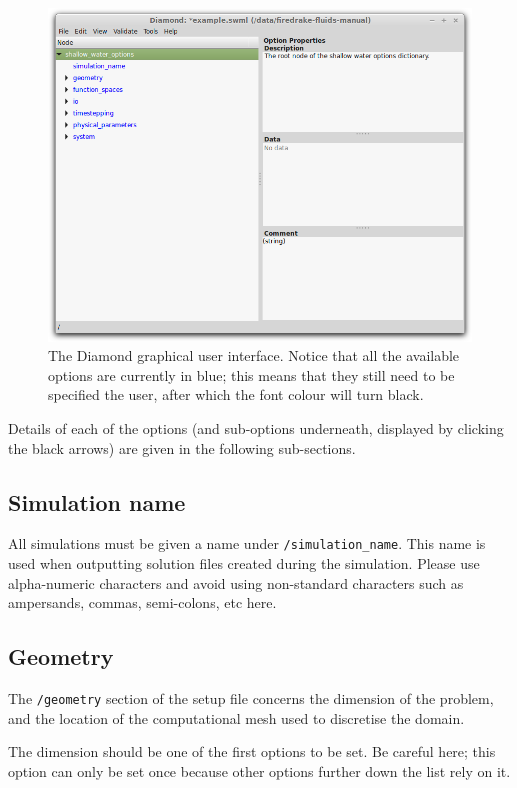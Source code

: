 \documentclass[a4paper,11pt]{report}
\begin{document}
\begin{figure}[!ht]
   \centering
   \includegraphics[width=1\columnwidth]{images/diamond.png}
   \caption{The Diamond \citep{Ham_etal_2009} graphical user interface. Notice that all the available options are currently in blue; this means that they still need to be specified the user, after which the font colour will turn black.}
   \label{fig:diamond}
\end{figure}

Details of each of the options (and sub-options underneath, displayed by clicking the black arrows) are given in the following sub-sections.

\subsection{Simulation name}
All simulations must be given a name under \texttt{/simulation\_name}. This name is used when outputting solution files created during the simulation. Please use alpha-numeric characters and avoid using non-standard characters such as ampersands, commas, semi-colons, etc here.

\subsection{Geometry}
The \texttt{/geometry} section of the setup file concerns the dimension of the problem, and the location of the computational mesh used to discretise the domain.

The dimension should be one of the first options to be set. Be careful here; this option can only be set once because other options further down the list rely on it.
\end{document}
